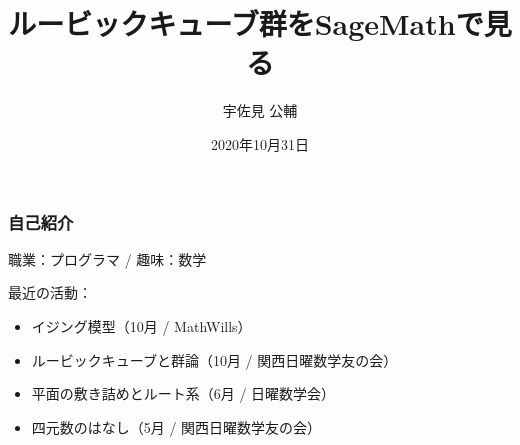 \documentclass{beamer}
\title{ルービックキューブ群をSageMathで見る}
\author{宇佐見 公輔}
\date{2020年10月31日}
\begin{document}
\maketitle

\begin{frame}
    \frametitle{自己紹介}

    職業：プログラマ / 趣味：数学

    \bigskip

    最近の活動：
    \begin{itemize}
        \item イジング模型（10月 / MathWills）
        \item ルービックキューブと群論（10月 / 関西日曜数学友の会）
        \item 平面の敷き詰めとルート系（6月 / 日曜数学会）
        \item 四元数のはなし（5月 / 関西日曜数学友の会）
    \end{itemize}
\end{frame}
\end{document}
